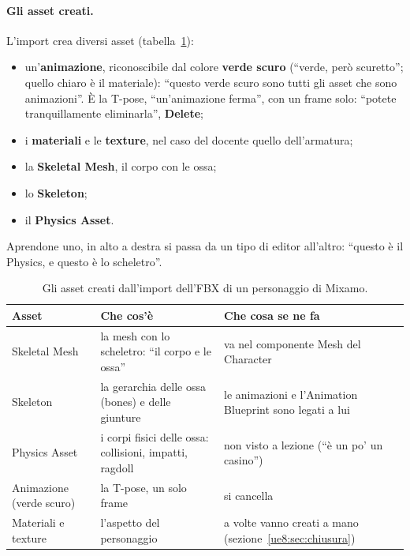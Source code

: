 \paragraph{Gli asset creati.} L'import crea diversi asset (tabella~\ref{ue8:tab:asset}):
\begin{itemize}
  \item un'\textbf{animazione}, riconoscibile dal colore \textbf{verde scuro}
        (``verde, però scuretto''; quello chiaro è il materiale): ``questo verde scuro
        sono tutti gli asset che sono animazioni''. È la T-pose, ``un'animazione ferma'',
        con un frame solo: ``potete tranquillamente eliminarla'', \textbf{Delete};
  \item i \textbf{materiali} e le \textbf{texture}, nel caso del docente quello
        dell'armatura;
  \item la \textbf{Skeletal Mesh}, il corpo con le ossa;
  \item lo \textbf{Skeleton};
  \item il \textbf{Physics Asset}.
\end{itemize}
Aprendone uno, in alto a destra si passa da un tipo di editor all'altro: ``questo è il
Physics, e questo è lo scheletro''.

\begin{table}[htbp]
\centering
\small
\begin{tabular}{@{}p{3.0cm}p{6.0cm}p{5.0cm}@{}}
\toprule
\textbf{Asset} & \textbf{Che cos'è} & \textbf{Che cosa se ne fa} \\
\midrule
Skeletal Mesh & la mesh con lo scheletro: ``il corpo e le ossa'' & va nel componente
Mesh del Character \\
Skeleton & la gerarchia delle ossa (bones) e delle giunture & le animazioni e
l'Animation Blueprint sono legati a lui \\
Physics Asset & i corpi fisici delle ossa: collisioni, impatti, ragdoll & non visto a
lezione (``è un po' un casino'') \\
Animazione (verde scuro) & la T-pose, un solo frame & si cancella \\
Materiali e texture & l'aspetto del personaggio & a volte vanno creati a mano
(sezione~\ref{ue8:sec:chiusura}) \\
\bottomrule
\end{tabular}
\caption{Gli asset creati dall'import dell'FBX di un personaggio di Mixamo.}
\label{ue8:tab:asset}
\end{table}

